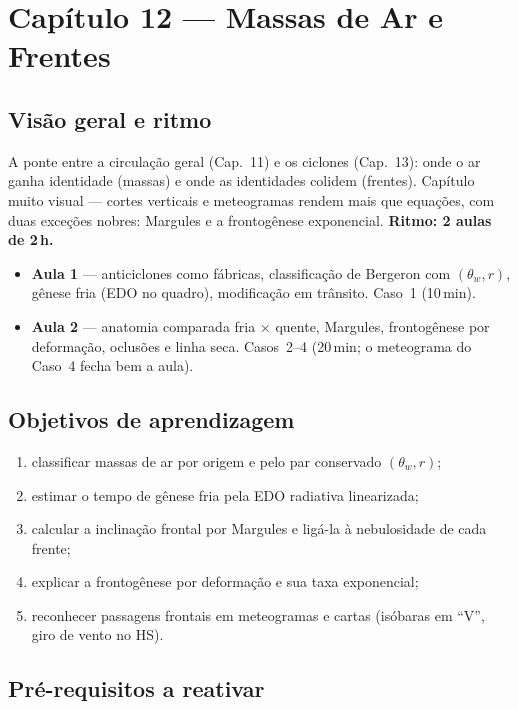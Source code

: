 \section{Capítulo 12 --- Massas de Ar e Frentes}

\subsection*{Visão geral e ritmo}

A ponte entre a circulação geral (Cap.~11) e os ciclones (Cap.~13): onde
o ar ganha identidade (massas) e onde as identidades colidem (frentes).
Capítulo muito visual — cortes verticais e meteogramas rendem mais que
equações, com duas exceções nobres: Margules e a frontogênese
exponencial. \textbf{Ritmo: 2 aulas de 2\,h.}

\begin{itemize}
  \item \textbf{Aula 1} — anticiclones como fábricas, classificação de
        Bergeron com $(\theta_w, r)$, gênese fria (EDO no quadro),
        modificação em trânsito. Caso~1 (10\,min).
  \item \textbf{Aula 2} — anatomia comparada fria × quente, Margules,
        frontogênese por deformação, oclusões e linha seca. Casos~2--4
        (20\,min; o meteograma do Caso~4 fecha bem a aula).
\end{itemize}

\subsection*{Objetivos de aprendizagem}

\begin{enumerate}
  \item classificar massas de ar por origem e pelo par conservado
        $(\theta_w, r)$;
  \item estimar o tempo de gênese fria pela EDO radiativa linearizada;
  \item calcular a inclinação frontal por Margules e ligá-la à
        nebulosidade de cada frente;
  \item explicar a frontogênese por deformação e sua taxa exponencial;
  \item reconhecer passagens frontais em meteogramas e cartas
        (isóbaras em ``V'', giro de vento no HS).
\end{enumerate}

\subsection*{Pré-requisitos a reativar}

